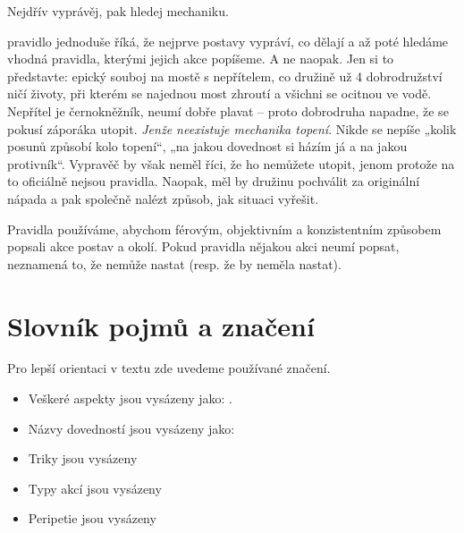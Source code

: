 \documentclass[../main.tex]{subfiles}
\begin{document}
\begin{pravidlo}
  \centering
  Nejdřív vyprávěj, pak hledej mechaniku.
\end{pravidlo}


\begin{sloppypar}
pravidlo jednoduše říká, že nejprve postavy vypráví, co dělají a až poté hledáme vhodná pravidla, kterými jejich akce popíšeme. A ne naopak. Jen si to představte: epický souboj na mostě s nepřítelem, co družině už 4 dobrodružství ničí životy, při kterém se najednou most zhroutí a všichni se ocitnou ve vodě. Nepřítel je černokněžník, neumí dobře plavat – proto dobrodruha napadne, že se pokusí záporáka utopit. \emph{Jenže neexistuje mechanika topení}. Nikde se nepíše „kolik posunů způsobí kolo topení“, „na jakou dovednost si házím já a na jakou protivník“. Vypravěč by však neměl říci, že ho nemůžete utopit, jenom protože na to oficiálně nejsou pravidla. Naopak, měl by družinu pochválit za originální nápada a pak společně nalézt způsob, jak situaci vyřešit.

\end{sloppypar}

Pravidla používáme, abychom férovým, objektivním a konzistentním způsobem popsali akce postav a okolí. Pokud pravidla nějakou akci neumí popsat, neznamená to, že nemůže nastat (resp. že by neměla nastat).

\section{Slovník pojmů a značení}
\label{sec:slovnik}
Pro lepší orientaci v textu zde uvedeme používané značení.

\begin{itemize}\RaggedRight
\item Veškeré aspekty jsou vysázeny jako: .
\item Názvy dovedností jsou vysázeny jako: 
\item Triky jsou vysázeny 
\item Typy akcí jsou vysázeny 
\item Peripetie jsou vysázeny 
\end{itemize}
\end{document}

